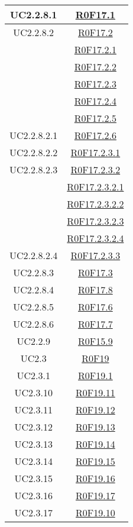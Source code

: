 \documentclass[../AnalisiDeiRequisiti.tex]{subfiles}
\begin{document}
\begin{longtable}{|c|c|}
	UC2.2.8.1 & \hyperlink{R0F17.1}{R0F17.1}\\\hline
	UC2.2.8.2 & \hyperlink{R0F17.2}{R0F17.2}\\& \hyperlink{R0F17.2.1}{R0F17.2.1}\\& \hyperlink{R0F17.2.2}{R0F17.2.2}\\& \hyperlink{R0F17.2.3}{R0F17.2.3}\\& \hyperlink{R0F17.2.4}{R0F17.2.4}\\& \hyperlink{R0F17.2.5}{R0F17.2.5}\\\hline
	UC2.2.8.2.1 & \hyperlink{R0F17.2.6}{R0F17.2.6}\\\hline
	UC2.2.8.2.2 & \hyperlink{R0F17.2.3.1}{R0F17.2.3.1}\\\hline
	UC2.2.8.2.3 & \hyperlink{R0F17.2.3.2}{R0F17.2.3.2}\\& \hyperlink{R0F17.2.3.2.1}{R0F17.2.3.2.1}\\& \hyperlink{R0F17.2.3.2.2}{R0F17.2.3.2.2}\\& \hyperlink{R0F17.2.3.2.3}{R0F17.2.3.2.3}\\& \hyperlink{R0F17.2.3.2.4}{R0F17.2.3.2.4}\\\hline
	UC2.2.8.2.4 & \hyperlink{R0F17.2.3.3}{R0F17.2.3.3}\\\hline
	UC2.2.8.3 & \hyperlink{R0F17.3}{R0F17.3}\\\hline
	UC2.2.8.4 & \hyperlink{R0F17.8}{R0F17.8}\\\hline
	UC2.2.8.5 & \hyperlink{R0F17.6}{R0F17.6}\\\hline
	UC2.2.8.6 & \hyperlink{R0F17.7}{R0F17.7}\\\hline
	UC2.2.9 & \hyperlink{R0F15.9}{R0F15.9}\\\hline
	UC2.3 & \hyperlink{R0F19}{R0F19}\\\hline
	UC2.3.1 & \hyperlink{R0F19.1}{R0F19.1}\\\hline
	UC2.3.10 & \hyperlink{R0F19.11}{R0F19.11}\\\hline
	UC2.3.11 & \hyperlink{R0F19.12}{R0F19.12}\\\hline
	UC2.3.12 & \hyperlink{R0F19.13}{R0F19.13}\\\hline
	UC2.3.13 & \hyperlink{R0F19.14}{R0F19.14}\\\hline
	UC2.3.14 & \hyperlink{R0F19.15}{R0F19.15}\\\hline
	UC2.3.15 & \hyperlink{R0F19.16}{R0F19.16}\\\hline
	UC2.3.16 & \hyperlink{R0F19.17}{R0F19.17}\\\hline
	UC2.3.17 & \hyperlink{R0F19.10}{R0F19.10}\\\hline

\end{longtable}
\end{document}
